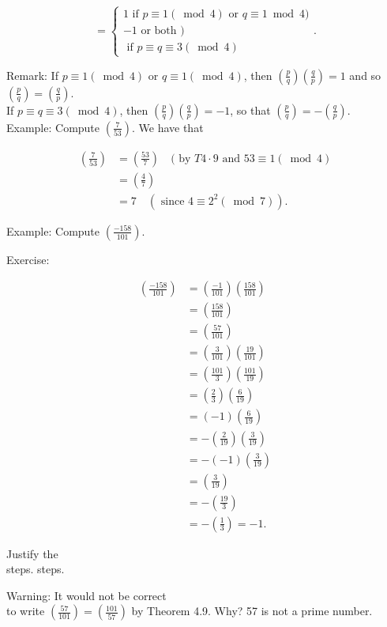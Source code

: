 \documentclass[10pt]{article}
\begin{document}
$$
=\left\{\begin{array}{c}
1 \text { if } p \equiv 1(\bmod 4) \text { or } q \equiv 1 \bmod 4) \\
-1 \text { or both }) \\
\text { if } p \equiv q \equiv 3(\bmod 4)
\end{array} .\right.
$$

Remark: If $p \equiv 1(\bmod 4)$ or $q \equiv 1(\bmod 4)$, then $\left(\frac{p}{q}\right)\left(\frac{q}{p}\right)=1$ and so $\left(\frac{p}{q}\right)=\left(\frac{q}{p}\right)$.\\
If $p \equiv q \equiv 3(\bmod 4)$, then $\left(\frac{p}{q}\right)\left(\frac{q}{p}\right)=-1$, so that $\left(\frac{p}{q}\right)=-\left(\frac{q}{p}\right)$.\\
Example: Compute $\left(\frac{7}{53}\right)$. We have that

$$
\begin{aligned}
\left(\frac{7}{53}\right) & =\left(\frac{53}{7}\right) \quad(\text { by } T 4 \cdot 9 \text { and } 53 \equiv 1(\bmod 4) \\
& =\left(\frac{4}{7}\right) \\
& =7 \quad\left(\text { since } 4 \equiv 2^{2}(\bmod 7)\right) .
\end{aligned}
$$

Example: Compute $\left(\frac{-158}{101}\right)$.

Exercise:

$$
\begin{aligned}
\left(\frac{-158}{101}\right) & =\left(\frac{-1}{101}\right)\left(\frac{158}{101}\right) \\
& =\left(\frac{158}{101}\right) \\
& =\left(\frac{57}{101}\right) \\
& =\left(\frac{3}{101}\right)\left(\frac{19}{101}\right) \\
& =\left(\frac{101}{3}\right)\left(\frac{101}{19}\right) \\
& =\left(\frac{2}{3}\right)\left(\frac{6}{19}\right) \\
& =(-1)\left(\frac{6}{19}\right) \\
& =-\left(\frac{2}{19}\right)\left(\frac{3}{19}\right) \\
& =-(-1)\left(\frac{3}{19}\right) \\
& =\left(\frac{3}{19}\right) \\
& =-\left(\frac{19}{3}\right) \\
& =-\left(\frac{1}{3}\right)=-1 .
\end{aligned}
$$

Justify the\\
steps. steps.

Warning: It would not be correct\\
to write $\left(\frac{57}{101}\right)=\left(\frac{101}{57}\right)$ by Theorem 4.9. Why? 57 is not a prime number.
\end{document}
